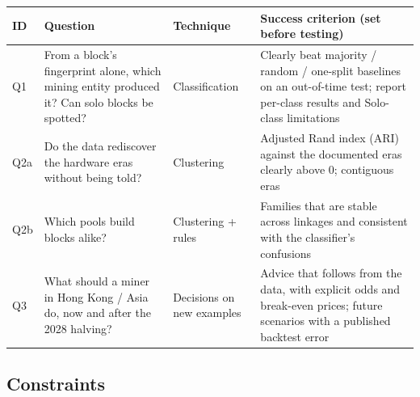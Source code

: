 \documentclass[
  11pt,
  a4paper,
]{article}
\newenvironment{reporttable}{\par\small\sffamily}{\par}
\begin{document}
\begin{reporttable}

\begin{longtable}[]{@{}
  >{\raggedright\arraybackslash}p{}
  >{\raggedright\arraybackslash}p{}
  >{\raggedright\arraybackslash}p{}
  >{\raggedright\arraybackslash}p{}@{}}
\toprule\noalign{}
\begin{minipage}[b]{\linewidth}\raggedright
\textbf{ID}
\end{minipage} & \begin{minipage}[b]{\linewidth}\raggedright
\textbf{Question}
\end{minipage} & \begin{minipage}[b]{\linewidth}\raggedright
\textbf{Technique}
\end{minipage} & \begin{minipage}[b]{\linewidth}\raggedright
\textbf{Success criterion (set before testing)}
\end{minipage} \\
\midrule\noalign{}
\endhead
\bottomrule\noalign{}
\endlastfoot
Q1 & From a block's fingerprint alone, which mining entity produced it?
Can solo blocks be spotted? & Classification & Clearly beat majority /
random / one-split baselines on an out-of-time test; report per-class
results and Solo-class limitations \\
Q2a & Do the data rediscover the hardware eras without being told? &
Clustering & Adjusted Rand index (ARI) against the documented eras
clearly above 0; contiguous eras \\
Q2b & Which pools build blocks alike? & Clustering + rules & Families
that are stable across linkages and consistent with the classifier's
confusions \\
Q3 & What should a miner in Hong Kong / Asia do, now and after the 2028
halving? & Decisions on new examples & Advice that follows from the
data, with explicit odds and break-even prices; future scenarios with a
published backtest error \\
\end{longtable}

\end{reporttable}


\subsection{Constraints}\label{constraints}
\end{document}
